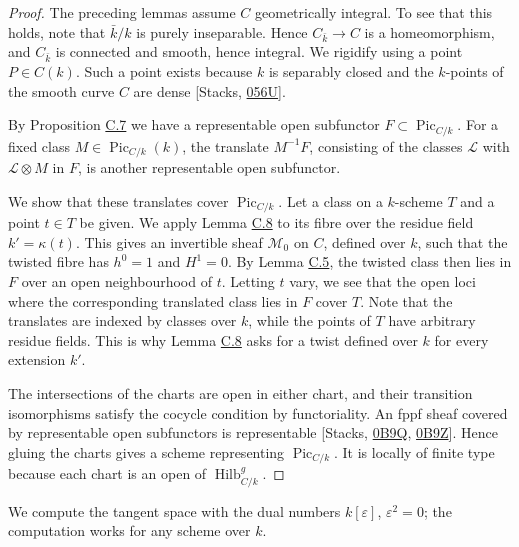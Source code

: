 \documentclass[11pt]{article}
\begin{document}
\begin{proof}[{Proof}]\label{bp32}%
The preceding lemmas assume \(C\) geometrically integral. To see that this holds, note that \(\bar k/k\) is purely inseparable. Hence \(C_{\bar k}\to C\) is a homeomorphism, and \(C_{\bar k}\) is connected and smooth, hence integral. We rigidify using a point \(P\in C(k)\). Such a point exists because \(k\) is separably closed and the \(k\)-points of the smooth curve \(C\) are dense [Stacks, \href{https://stacks.math.columbia.edu/tag/056U}{056U}].

By Proposition \hyperref[bp24]{C.7} we have a representable open subfunctor \(F\subset\operatorname{Pic}_{C/k}\). For a fixed class \(M\in\operatorname{Pic}_{C/k}(k)\), the translate \(M^{-1}F\), consisting of the classes \(\mathcal L\) with \(\mathcal L\otimes M\) in \(F\), is another representable open subfunctor.

We show that these translates cover \(\operatorname{Pic}_{C/k}\). Let a class on a \(k\)-scheme \(T\) and a point \(t\in T\) be given. We apply Lemma \hyperref[bp27]{C.8} to its fibre over the residue field \(k'=\kappa(t)\). This gives an invertible sheaf \(\mathcal M_0\) on \(C\), defined over \(k\), such that the twisted fibre has \(h^0=1\) and \(H^1=0\). By Lemma \hyperref[bp17]{C.5}, the twisted class then lies in \(F\) over an open neighbourhood of \(t\). Letting \(t\) vary, we see that the open loci where the corresponding translated class lies in \(F\) cover \(T\). Note that the translates are indexed by classes over \(k\), while the points of \(T\) have arbitrary residue fields. This is why Lemma \hyperref[bp27]{C.8} asks for a twist defined over \(k\) for every extension \(k'\).

The intersections of the charts are open in either chart, and their transition isomorphisms satisfy the cocycle condition by functoriality. An fppf sheaf covered by representable open subfunctors is representable [Stacks, \href{https://stacks.math.columbia.edu/tag/0B9Q}{0B9Q}, \href{https://stacks.math.columbia.edu/tag/0B9Z}{0B9Z}]. Hence gluing the charts gives a scheme representing \(\operatorname{Pic}_{C/k}\). It is locally of finite type because each chart is an open of \(\operatorname{Hilb}^{g}_{C/k}\).
\end{proof}

\label{bp33}%
We compute the tangent space with the dual numbers \(k[\varepsilon]\), \(\varepsilon^2=0\); the computation works for any scheme over \(k\).
\end{document}
